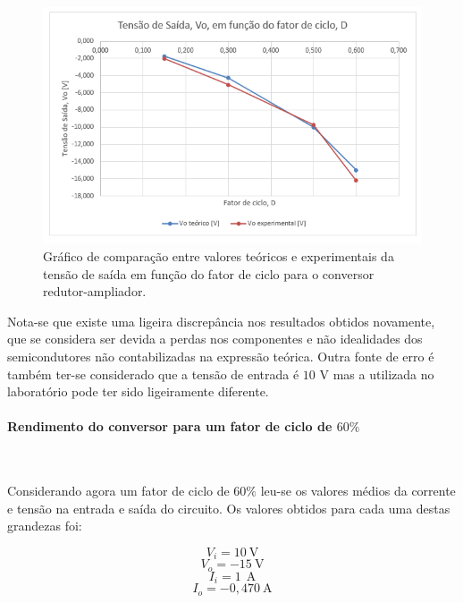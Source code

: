 \documentclass[a4paper,11pt]{article}
\numberwithin{equation}{section}
\begin{document}
\begin{figure}[H]
	\centering
	\includegraphics[keepaspectratio=true, scale=0.8]{teoricas/graf_buck_boost}
	\caption{Gráfico de comparação entre valores teóricos e experimentais da tensão de saída em função do fator de ciclo para o conversor redutor-ampliador.}
	\label{fig:graf_buck_boost}
	\vspace{-0.8em}
\end{figure}

Nota-se que existe uma ligeira discrepância nos resultados obtidos novamente, que se considera ser devida a perdas nos componentes e não idealidades dos semicondutores não contabilizadas na expressão teórica. Outra fonte de erro é também ter-se considerado que a tensão de entrada é $10$ V mas a utilizada no laboratório pode ter sido ligeiramente diferente.

\paragraph{Rendimento do conversor para um fator de ciclo de $60\%$}\mbox{}\

Considerando agora um fator de ciclo de $60\%$ leu-se os valores médios da corrente e tensão na entrada e saída do circuito. Os valores obtidos para cada uma destas grandezas foi:

\begin{equation}
V_i = 10 ~ \text{V}
\end{equation} 
\vspace{-0,8 cm}
\begin{equation}
V_o = -15 ~ \text{V}
\end{equation} 
\vspace{-0,8 cm}
\begin{equation}
I_i = 1 ~  ~ \text{A}
\end{equation} 
\vspace{-0,8 cm}
\begin{equation}
I_o =-0,470  ~ \text{A}
\end{equation} 
\end{document}
